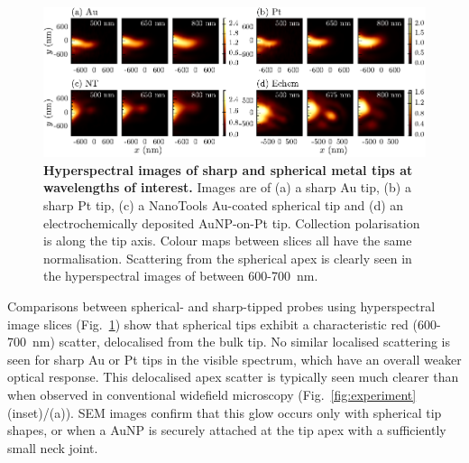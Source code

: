 \documentclass{article}
\begin{document}
\begin{figure}[bt]
\centering
\includegraphics{figures/hyperspectral_tip_comparison}
\caption[Hyperspectral images of sharp and spherical metal tips at wavelengths of interest]{\textbf{Hyperspectral images of sharp and spherical metal tips at wavelengths of interest.} Images are of (a) a sharp Au tip, (b) a sharp Pt tip, (c) a NanoTools Au-coated spherical tip and (d) an electrochemically deposited AuNP-on-Pt tip. Collection polarisation is along the tip axis. Colour maps between slices all have the same normalisation.
Scattering from the spherical apex is clearly seen in the hyperspectral images of between 600-\SI{700}{nm}.}
\label{fig:hyperspectral_tip_comparison}
\vspace{-5pt}
\end{figure}

Comparisons between spherical- and sharp-tipped probes using hyperspectral image slices (Fig.~\ref{fig:hyperspectral_tip_comparison}) show that spherical tips exhibit a characteristic red (600-\SI{700}{nm}) scatter, delocalised from the bulk tip. No similar localised scattering is seen for sharp Au or Pt tips in the visible spectrum, which have an overall weaker optical response. This delocalised apex scatter is typically seen much clearer than when observed in conventional widefield microscopy (Fig.~\ref{fig:experiment}{\color{red}(inset)/(a)}). SEM images confirm that this glow occurs only with spherical tip shapes, or when a AuNP is securely attached at the tip apex with a sufficiently small neck joint.
\end{document}
